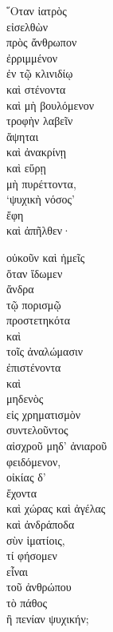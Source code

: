 {\large
\begin{greek}
\noindent  ῞Οταν ἰατρὸς \\
\tabto{2em} εἰσελθὼν \\
\tabto{4em} πρὸς ἄνθρωπον \\
\tabto{6em} ἐρριμμένον \\
\tabto{8em} ἐν τῷ κλινιδίῳ \\
\tabto{6em} καὶ στένοντα \\
\tabto{6em} καὶ μὴ βουλόμενον \\
\tabto{8em} τροφὴν λαβεῖν \\
ἅψηται \\
καὶ ἀνακρίνῃ \\
καὶ εὕρῃ \\
\tabto{2em} μὴ πυρέττοντα,\\
‘ψυχικὴ νόσος’\\
\tabto{2em} ἔφη \\
καὶ ἀπῆλθεν·

\noindent οὐκοῦν καὶ ἡμεῖς \\
\tabto{2em} ὅταν ἴδωμεν \\
\tabto{4em} ἄνδρα \\
\tabto{6em} τῷ πορισμῷ \\
\tabto{4em} προστετηκότα \\
\tabto{4em} καὶ \\
\tabto{6em} τοῖς ἀναλώμασιν \\
\tabto{4em} ἐπιστένοντα \\
\tabto{4em} καὶ \\
\tabto{6em} μηδενὸς \\
\tabto{8em} εἰς χρηματισμὸν \\
\tabto{6em} συντελοῦντος \\
\tabto{6em} αἰσχροῦ μηδ' ἀνιαροῦ \\
\tabto{4em} φειδόμενον, \\
\tabto{4em} οἰκίας δ' \\
\tabto{6em} ἔχοντα\\
\tabto{4em} καὶ χώρας καὶ ἀγέλας \\
\tabto{4em} καὶ ἀνδράποδα \\
\tabto{6em} σὺν ἱματίοις,\\
τί φήσομεν \\
\tabto{2em} εἶναι \\
\tabto{4em} τοῦ ἀνθρώπου \\
\tabto{2em} τὸ πάθος \\
\tabto{4em} ἢ πενίαν ψυχικήν;\\

\end{greek}
}

